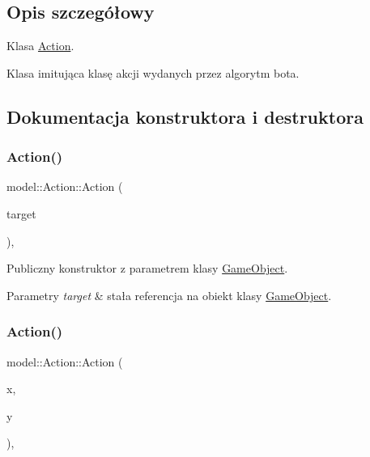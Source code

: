 \subsection{Opis szczegółowy}
Klasa \hyperlink{classmodel_1_1Action}{Action}. 

Klasa imitująca klasę akcji wydanych przez algorytm bota. 

\subsection{Dokumentacja konstruktora i destruktora}
\mbox{\label{classmodel_1_1Action_a0c62dc2f134f0feb4bc1eb5ac9ce5e67}} 
\subsubsection{\texorpdfstring{Action()}{Action()}\hspace{0.1cm}{\footnotesize\ttfamily [1/2]}}
{\footnotesize\ttfamily model\+::\+Action\+::\+Action (\begin{DoxyParamCaption}\item[{const \hyperlink{classmodel_1_1GameObject}{Game\+Object} \&}]{target }\end{DoxyParamCaption})\hspace{0.3cm}{\ttfamily [inline]}, {\ttfamily [explicit]}}



Publiczny konstruktor z parametrem klasy \hyperlink{classmodel_1_1GameObject}{Game\+Object}. 


\begin{DoxyParams}{Parametry}
{\em target} & stała referencja na obiekt klasy \hyperlink{classmodel_1_1GameObject}{Game\+Object}. \\
\hline
\end{DoxyParams}
\mbox{\label{classmodel_1_1Action_a0293d4a2d9f4bd4bf9f6b4427f83d531}} 
\subsubsection{\texorpdfstring{Action()}{Action()}\hspace{0.1cm}{\footnotesize\ttfamily [2/2]}}
{\footnotesize\ttfamily model\+::\+Action\+::\+Action (\begin{DoxyParamCaption}\item[{int}]{x,  }\item[{int}]{y }\end{DoxyParamCaption})\hspace{0.3cm}{\ttfamily [inline]}, {\ttfamily [explicit]}}



